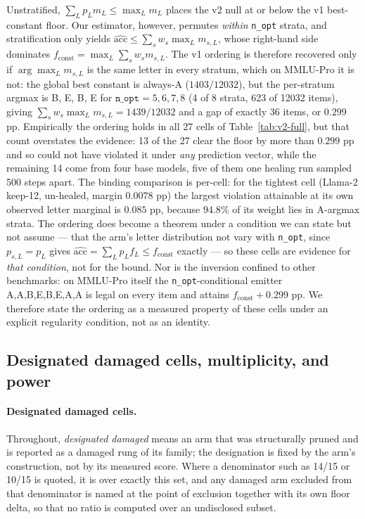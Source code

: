 Unstratified, $\sum_L p_{L}m_{L}\leq\max_Lm_{L}$ places the v2 null at or below the v1 best-constant floor. Our estimator, however, permutes \emph{within} \texttt{n\_opt} strata, and stratification only yields $\widehat{\mathrm{acc}}\leq\sum_s w_s\max_L m_{s,L}$, whose right-hand side dominates $f_{\mathrm{const}}=\max_L\sum_s w_s m_{s,L}$. The v1 ordering is therefore recovered only if $\arg\max_L m_{s,L}$ is the same letter in every stratum, which on MMLU-Pro it is not: the global best constant is always-A ($1403/12032$), but the per-stratum argmax is B, E, B, E for $\texttt{n\_opt}=5,6,7,8$ (4 of 8 strata, 623 of 12032 items), giving $\sum_s w_s\max_L m_{s,L}=1439/12032$ and a gap of exactly $36$ items, or $0.299$ pp. Empirically the ordering holds in all 27 cells of Table~\ref{tab:v2-full}, but that count overstates the evidence: 13 of the 27 clear the floor by more than $0.299$ pp and so could not have violated it under \emph{any} prediction vector, while the remaining 14 come from four base models, five of them one healing run sampled 500 steps apart. The binding comparison is per-cell: for the tightest cell (Llama-2 keep-12, un-healed, margin $0.0078$ pp) the largest violation attainable at its own observed letter marginal is $0.085$ pp, because $94.8\%$ of its weight lies in A-argmax strata. The ordering does become a theorem under a condition we can state but not assume --- that the arm's letter distribution not vary with \texttt{n\_opt}, since $p_{s,L}=p_{L}$ gives $\widehat{\mathrm{acc}}=\sum_L p_{L}f_{L}\leq f_{\mathrm{const}}$ exactly --- so these cells are evidence for \emph{that condition}, not for the bound. Nor is the inversion confined to other benchmarks: on MMLU-Pro itself the \texttt{n\_opt}-conditional emitter A,A,B,E,B,E,A,A is legal on every item and attains $f_{\mathrm{const}}+0.299$ pp. We therefore state the ordering as a measured property of these cells under an explicit regularity condition, not as an identity.



\FloatBarrier

\subsection{Designated damaged cells, multiplicity, and power}
\label{app:designated}

\paragraph{Designated damaged cells.} Throughout, \emph{designated damaged} means an arm that was structurally pruned and is reported as a damaged rung of its family; the designation is fixed by the arm's construction, not by its measured score. Where a denominator such as 14/15 or 10/15 is quoted, it is over exactly this set, and any damaged arm excluded from that denominator is named at the point of exclusion together with its own floor delta, so that no ratio is computed over an undisclosed subset.

